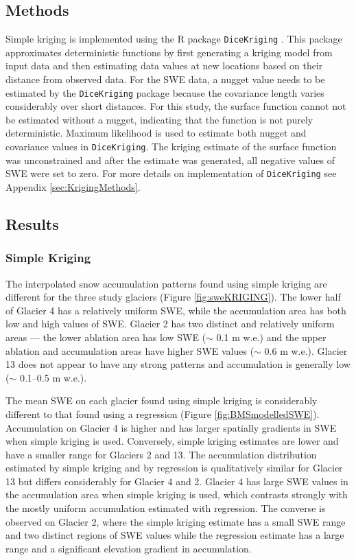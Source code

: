 \documentclass[12pt]{article}
\begin{document}
\subsection{Methods}

Simple kriging is implemented using the R package \texttt{DiceKriging} \citep{Roustant2012}. This package approximates deterministic functions by first generating a kriging model from input data and then estimating data values at new locations based on their distance from observed data. For the SWE data, a nugget value needs to be estimated by the \texttt{DiceKriging} package because the covariance length varies considerably over short distances. For this study, the surface function cannot not be estimated without a nugget, indicating that the function is not purely deterministic. Maximum likelihood is used to estimate both nugget and covariance values in \texttt{DiceKriging}. The kriging estimate of the surface function was unconstrained and after the estimate was generated, all negative values of SWE were set to zero. For more details on implementation of \texttt{DiceKriging} see Appendix \ref{sec:KrigingMethods}.

\subsection{Results}

\subsubsection{Simple Kriging}

The interpolated snow accumulation patterns found using simple kriging are different for the three study glaciers  (Figure \ref{fig:sweKRIGING}). The lower half of Glacier 4 has a relatively uniform SWE, while the accumulation area has both low and high values of SWE. Glacier 2 has two distinct and relatively uniform areas --- the lower ablation area has low SWE ($\sim$ 0.1 m w.e.) and the upper ablation and accumulation areas have higher SWE values ($\sim$ 0.6 m w.e.). Glacier 13 does not appear to have any strong patterns and accumulation is generally low ($\sim$ 0.1--0.5 m w.e.). 

The mean SWE on each glacier found using simple kriging is considerably different to that found using a regression (Figure \ref{fig:BMSmodelledSWE}). Accumulation on Glacier 4 is higher and has larger spatially gradients in SWE when simple kriging is used. Conversely, simple kriging estimates are lower and have a smaller range for Glaciers 2 and 13.  The accumulation distribution estimated by simple kriging and by regression is qualitatively similar for Glacier 13 but differs considerably for Glacier 4 and 2. Glacier 4 has large SWE values in the accumulation area when simple kriging is used, which contrasts strongly with the mostly uniform accumulation estimated with regression. The converse is observed on Glacier 2, where the simple kriging estimate has a small SWE range and two distinct regions of SWE values while the regression estimate has a large range and a significant elevation gradient in accumulation.
\end{document}
